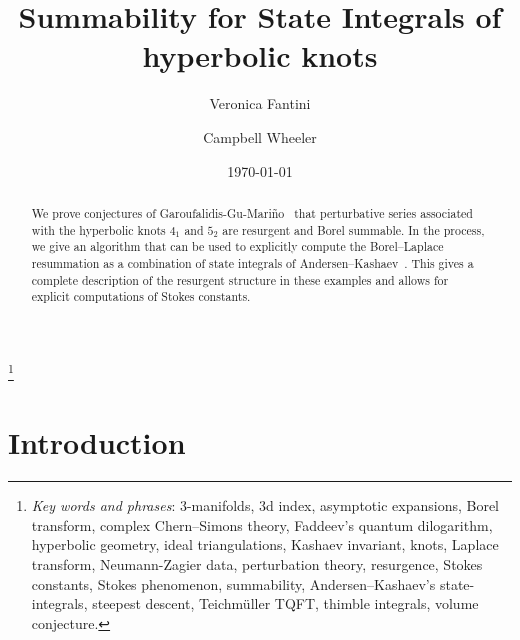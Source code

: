 \documentclass[12pt,reqno]{amsart}
\theoremstyle{definition}
\renewcommand{\=}{\;=\;}
\begin{document}
\title[Summability for State Integrals of hyperbolic knots]{
 Summability for State Integrals of hyperbolic knots}
\author{Veronica Fantini}
\address{Institut des Hautes Études Scientifiques \\
          \newline
         {\tt \url{https://sites.google.com/view/vfantini/home-page}}}
\author{Campbell Wheeler}
\address{Institut des Hautes Études Scientifiques \\
          \newline
         {\tt \url{https://www.ihes.fr/~wheeler/}}}
\thanks{
  {\em Key words and phrases}:
  3-manifolds,
  3d index,
  asymptotic expansions,
  Borel transform,
  complex Chern--Simons theory,
  Faddeev's quantum dilogarithm,
  hyperbolic geometry,
  ideal triangulations,
  Kashaev invariant,
  knots,
  Laplace transform,
  Neumann-Zagier data,
  perturbation theory,
  resurgence,
  Stokes constants,
  Stokes phenomenon,
  summability,
  Andersen--Kashaev's state-integrals,
  steepest descent,
  Teichm\"uller TQFT,
  thimble integrals,
  volume conjecture.
}

\date{\today }

\begin{abstract}
  We prove conjectures of Garoufalidis-Gu-Mariño~\cite{GGM:I} that perturbative series associated with the hyperbolic knots $4_1$ and $5_2$ are resurgent and Borel summable. In the process, we give an algorithm that can be used to explicitly compute the Borel--Laplace resummation as a combination of state integrals of Andersen--Kashaev~\cite{AK:I}.
  This gives a complete description of the resurgent structure in these examples and allows for explicit computations of Stokes constants.
\end{abstract}

\maketitle
{
\footnotesize
\tableofcontents
}

\section{Introduction}
\end{document}
